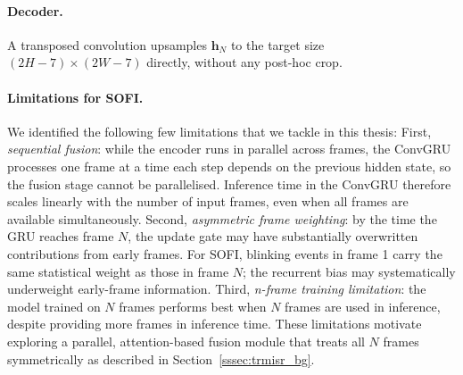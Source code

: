 \paragraph{Decoder.}
A transposed convolution upsamples $\mathbf{h}_N$ to the target size $(2H-7)\times(2W-7)$ directly,
without any post-hoc crop.

\paragraph{Limitations for SOFI.}
We identified the following few limitations that we tackle in this thesis:
First, \emph{sequential fusion}: while the encoder runs in parallel across frames, the ConvGRU
processes one frame at a time each step depends on the previous hidden state, so the fusion stage
cannot be parallelised. Inference time in the ConvGRU therefore scales linearly with the number of
input frames, even when all frames are available simultaneously.
Second, \emph{asymmetric frame weighting}: by the time the GRU reaches frame $N$, the update gate
may have substantially overwritten contributions from early frames. For SOFI, blinking events in
frame 1 carry the same statistical weight as those in frame $N$; the recurrent bias may
systematically underweight early-frame information.
Third, \emph{n-frame training limitation}: the model trained on $N$ frames performs best when $N$
frames are used in inference, despite providing more frames in inference time.
These limitations motivate exploring a parallel, attention-based fusion module that treats all
$N$ frames symmetrically as described in Section~\ref{sssec:trmisr_bg}.




